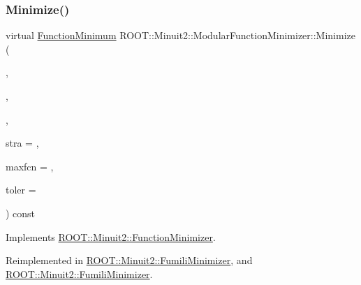 \subsubsection{\texorpdfstring{Minimize()}{Minimize()}\hspace{0.1cm}{\footnotesize\ttfamily [2/22]}}
{\footnotesize\ttfamily virtual \mbox{\hyperlink{classROOT_1_1Minuit2_1_1FunctionMinimum}{Function\+Minimum}} R\+O\+O\+T\+::\+Minuit2\+::\+Modular\+Function\+Minimizer\+::\+Minimize (\begin{DoxyParamCaption}\item[{const \mbox{\hyperlink{classROOT_1_1Minuit2_1_1FCNBase}{F\+C\+N\+Base}} \&}]{,  }\item[{const std\+::vector$<$ double $>$ \&}]{,  }\item[{const std\+::vector$<$ double $>$ \&}]{,  }\item[{unsigned int}]{stra = {},  }\item[{unsigned int}]{maxfcn = {},  }\item[{double}]{toler = {} }\end{DoxyParamCaption}) const\hspace{0.3cm}{\ttfamily [virtual]}}



Implements \mbox{\hyperlink{classROOT_1_1Minuit2_1_1FunctionMinimizer_aa664d755554be28f42be8270b8c35139}{R\+O\+O\+T\+::\+Minuit2\+::\+Function\+Minimizer}}.



Reimplemented in \mbox{\hyperlink{classROOT_1_1Minuit2_1_1FumiliMinimizer_ab9ec6dd4a0e664db7d23a3ea3b0a3c75}{R\+O\+O\+T\+::\+Minuit2\+::\+Fumili\+Minimizer}}, and \mbox{\hyperlink{classROOT_1_1Minuit2_1_1FumiliMinimizer_ab9ec6dd4a0e664db7d23a3ea3b0a3c75}{R\+O\+O\+T\+::\+Minuit2\+::\+Fumili\+Minimizer}}.

\mbox{\label{classROOT_1_1Minuit2_1_1ModularFunctionMinimizer_a8a71d388729f9e81c3c031a2962f4d99}} 
